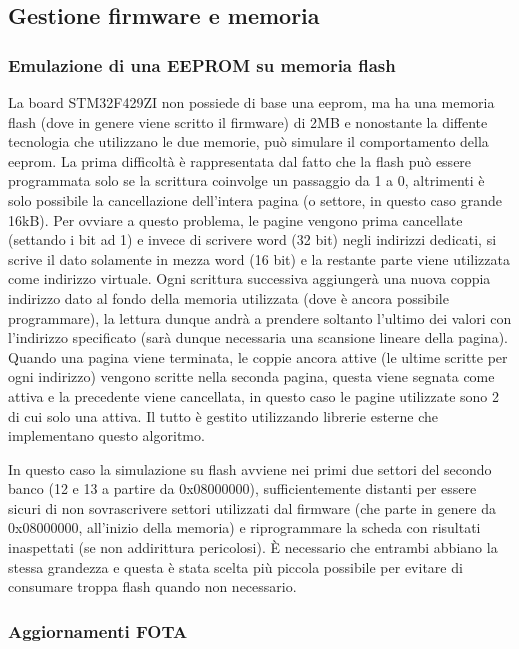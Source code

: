 \subsection{Gestione firmware e memoria}

\subsubsection{Emulazione di una EEPROM su memoria flash}

La board STM32F429ZI non possiede di base una eeprom, ma ha una memoria flash (dove in genere viene scritto il firmware) di 2MB e nonostante la diffente tecnologia che utilizzano le due memorie, pu\`o simulare il comportamento della eeprom. La prima difficolt\`a \`e rappresentata dal fatto che la flash pu\`o essere programmata solo se la scrittura coinvolge un passaggio da 1 a 0, altrimenti \`e solo possibile la cancellazione dell'intera pagina (o settore, in questo caso grande 16kB). Per ovviare a questo problema, le pagine vengono prima cancellate (settando i bit ad 1) e invece di scrivere word (32 bit) negli indirizzi dedicati, si scrive il dato solamente in mezza word (16 bit) e la restante parte viene utilizzata come indirizzo virtuale. Ogni scrittura successiva aggiunger\`a una nuova coppia indirizzo dato al fondo della memoria utilizzata (dove \`e ancora possibile programmare), la lettura dunque andr\`a a prendere soltanto l'ultimo dei valori con l'indirizzo specificato (sar\`a dunque necessaria una scansione lineare della pagina). Quando una pagina viene terminata, le coppie ancora attive (le ultime scritte per ogni indirizzo) vengono scritte nella seconda pagina, questa viene segnata come attiva e la precedente viene cancellata, in questo caso le pagine utilizzate sono 2 di cui solo una attiva. Il tutto \`e gestito utilizzando librerie esterne che implementano questo algoritmo.

In questo caso la simulazione su flash avviene nei primi due settori del secondo banco (12 e 13 a partire da 0x08000000), sufficientemente distanti per essere sicuri di non sovrascrivere settori utilizzati dal firmware (che parte in genere da 0x08000000, all'inizio della memoria) e riprogrammare la scheda con risultati inaspettati (se non addirittura pericolosi). \`E necessario che entrambi abbiano la stessa grandezza e questa \`e stata scelta pi\`u piccola possibile per evitare di consumare troppa flash quando non necessario.

\subsubsection{Aggiornamenti FOTA}


